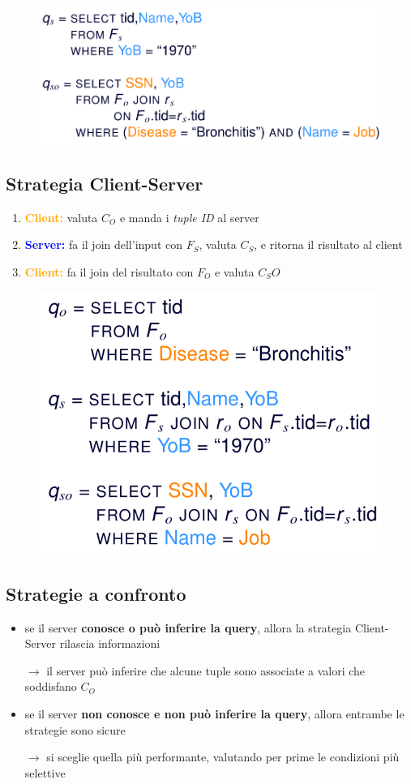 \documentclass{report}
\begin{document}
\begin{figure}[ht]
    \centering
    \includegraphics[width=0.8\linewidth]{images/fragmentation/sc-2.png}
\end{figure}

\subsection{Strategia Client-Server}
\begin{enumerate}
    \item \textcolor{orange}{\textbf{Client:}} valuta $C_O$ e manda i \textit{tuple ID} al server 
    \item \textcolor{blue}{\textbf{Server:}} fa il join dell'input con $F_S$, valuta $C_S$, e ritorna il risultato al client 
    \item \textcolor{orange}{\textbf{Client:}} fa il join del risultato con $F_O$ e valuta $C_SO$
\end{enumerate}

\begin{figure}[ht]
    \centering
    \includegraphics[width=0.6\linewidth]{images/fragmentation/cs.png}
\end{figure}

\subsection{Strategie a confronto}
\begin{itemize}
    \item se il server \textbf{conosce o può inferire la query}, allora la strategia Client-Server rilascia informazioni
    
    $\rightarrow$ il server può inferire che alcune tuple sono associate a valori che soddisfano $C_O$
    \item se il server \textbf{non conosce e non può inferire la query}, allora entrambe le strategie sono sicure 
    
    $\rightarrow$ si sceglie quella più performante, valutando per prime le condizioni più selettive
\end{itemize}
\end{document}

